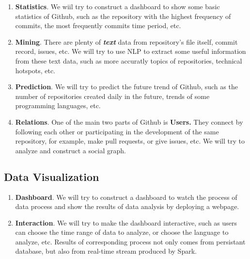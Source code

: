\begin{enumerate}
    \item \textbf{Statistics}. We wiil try to construct a dashboard to show some basic statistics of Github, such as the repository with the highest frequency of commits, the most frequently commits time period, etc.
    \item \textbf{Mining}. There are plenty of \textbf{\textit{text}} data from repository's file itself, commit record, issues, etc. We will try to use NLP to extract some useful information from these text data, such as more accuratly topics of repositories, technical hotspots, etc.
    \item \textbf{Prediction}. We will try to predict the future trend of Github, such as the number of repositories created daily in the future, trends of some programming languages, etc.
    \item \textbf{Relations}. One of the main two parts of Github is \textbf{Users.} They connect by following each other or participating in the development of the same repository, for example, make pull requests, or give issues, etc. We will try to analyze and construct a social graph.
\end{enumerate}


\subsection{Data Visualization}
\begin{enumerate}
    \item \textbf{Dashboard}. We will try to construct a dashboard to watch the process of data process and show the results of data analysis by deploying a webpage.
    \item \textbf{Interaction}. We will try to make the dashboard interactive, such as users can choose the time range of data to analyze, or choose the language to analyze, etc. Results of corresponding process not only comes from persistant database, but also from real-time stream produced by Spark.
\end{enumerate}






